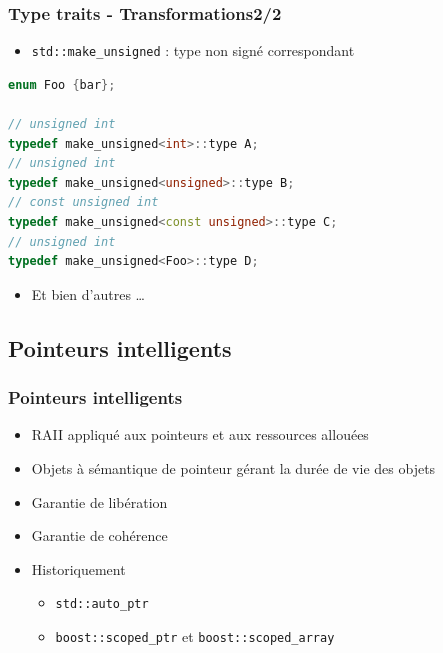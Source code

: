 \documentclass[C++.tex]{subfiles}
\begin{document}
\begin{frame}[fragile]
	\frametitle{Type traits - Transformations\titlehfill{}2/2}
	\begin{itemize}
		\item \lstinline|std::make_unsigned| : type non signé correspondant
	\end{itemize}

	\begin{lstlisting}[language=C++]
enum Foo {bar};

// unsigned int
typedef make_unsigned<int>::type A;
// unsigned int
typedef make_unsigned<unsigned>::type B;
// const unsigned int
typedef make_unsigned<const unsigned>::type C;
// unsigned int
typedef make_unsigned<Foo>::type D;\end{lstlisting}

	\begin{itemize}
		\item Et bien d'autres \ldots
	\end{itemize}
\end{frame}

\subsection*{Pointeurs intelligents}
\begin{frame}[fragile]
	\frametitle{Pointeurs intelligents}
	\begin{itemize}
		\item RAII appliqué aux pointeurs et aux ressources allouées
		\item Objets à sémantique de pointeur gérant la durée de vie des objets
		\item Garantie de libération
		\item Garantie de cohérence
		\item Historiquement
		\begin{itemize}
			\item \lstinline|std::auto_ptr|
			\item \lstinline|boost::scoped_ptr| et \lstinline|boost::scoped_array|
		\end{itemize}
	\end{itemize}
\end{frame}
\end{document}
